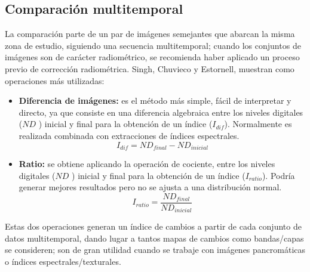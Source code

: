 \subsection{Comparaci\'on multitemporal}\label{subsec:compMult}
La comparaci\'on parte de un par de im\'agenes semejantes que abarcan la misma zona de estudio, siguiendo una secuencia multitemporal; cuando los conjuntos de im\'agenes son de car\'acter radiom\'etrico, se recomienda haber aplicado un proceso previo de correcci\'on radiom\'etrica. Singh\cite{singh1989review}, Chuvieco\cite{chuvieco1998factor} y Estornell\cite{estornell2004analisis}, muestran como operaciones más utilizadas:
	\begin{itemize}
		\item \textbf{Diferencia de im\'agenes:} es el m\'etodo m\'as simple, f\'acil de interpretar y directo, ya que consiste en una diferencia algebraica entre los niveles digitales ($ ND $ ) inicial y final para la obtenci\'on de un \'indice ($ I_{dif} $). Normalmente es realizada combinada  con extracciones de \'indices espectrales.
								\begin{equation}
								I_{dif} = ND_{final}-ND_{inicial}
								\end{equation} 	
				\item \textbf{Ratio:} se obtiene aplicando la operación de cociente, entre los niveles digitales ($ ND $ ) inicial y final para la obtenci\'on de un \'indice ($ I_{ratio} $). Podr\'ia  generar mejores resultados pero no se ajusta a una distribución normal.
										\begin{equation}
										I_{ratio} = \dfrac{ND_{final}}{ND_{inicial}}
										\end{equation} 	

		\end{itemize}
Estas dos operaciones generan un \'indice de cambios a partir de cada conjunto de datos multitemporal, dando lugar a tantos mapas de cambios como bandas/capas se consideren; son de gran utilidad cuando se trabaje con im\'agenes pancrom\'aticas o \'indices espectrales/texturales.
